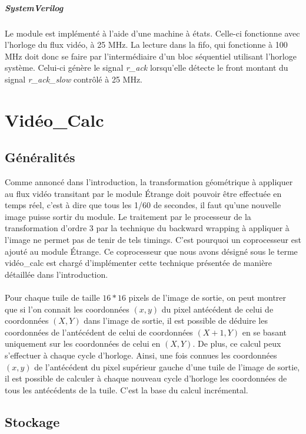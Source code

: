 \documentclass[a4paper,12pt]{report}
\begin{document}
{{		\paragraph{SystemVerilog}
	 Le module est implémenté à l'aide d'une machine à états.
		Celle-ci fonctionne avec l'horloge du flux vidéo, à 25 MHz.
		La lecture dans la fifo, qui fonctionne à 100 MHz doit donc se faire
		par l'intermédiaire d'un bloc séquentiel utilisant l'horloge système.
		Celui-ci génère le signal \emph{r\_ack} lorsqu'elle détecte le front montant
		du signal \emph{r\_ack\_slow} contrôlé à 25 MHz.


		\chapter{Vidéo\_Calc}

	 \section{Généralités}

	 Comme annoncé dans l'introduction, la transformation géométrique à appliquer au flux vidéo transitant par le module Étrange doit pouvoir être effectuée en temps réel, c'est à dire que tous les 1/60 de secondes, il faut qu'une nouvelle image puisse sortir du module. Le traitement par le processeur de la transformation d'ordre 3 par la technique du backward wrapping  à appliquer à l'image ne permet pas de tenir de tels timings. C'est pourquoi un coprocesseur est ajouté au module Étrange. Ce coprocesseur que nous avons désigné sous le terme vidéo\_calc est chargé d'implémenter cette technique présentée de manière détaillée dans l'introduction.
		\\
		\\
		Pour chaque tuile de taille $16*16$ pixels de l'image de sortie, on peut montrer que si l'on connait les coordonnées $(x,y)$ du pixel antécédent de celui de coordonnées $(X,Y)$ dans l'image de sortie, il est possible de déduire les coordonnées de l'antécédent de celui de coordonnées $(X+1,Y)$ en se basant uniquement sur les coordonnées de celui en $(X,Y)$. De plus, ce calcul peux s'effectuer à chaque cycle d'horloge.
		Ainsi, une fois connues les coordonnées $(x,y)$ de l'antécédent du pixel supérieur gauche d'une tuile de l'image de sortie, il est possible de calculer à chaque nouveau cycle d'horloge les coordonnées de tous les antécédents de la tuile. C'est la base du calcul incrémental.

		\section{Stockage}

}}
\end{document}
